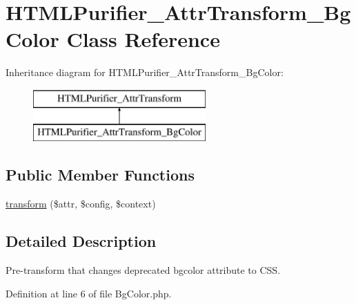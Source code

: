 \hypertarget{classHTMLPurifier__AttrTransform__BgColor}{\section{H\+T\+M\+L\+Purifier\+\_\+\+Attr\+Transform\+\_\+\+Bg\+Color Class Reference}
\label{classHTMLPurifier__AttrTransform__BgColor}
}
Inheritance diagram for H\+T\+M\+L\+Purifier\+\_\+\+Attr\+Transform\+\_\+\+Bg\+Color\+:\begin{figure}[H]
\begin{center}
\leavevmode
\includegraphics[height=2.000000cm]{classHTMLPurifier__AttrTransform__BgColor}
\end{center}
\end{figure}
\subsection*{Public Member Functions}
\begin{DoxyCompactItemize}
\item 
\hyperlink{classHTMLPurifier__AttrTransform__BgColor_a9e3101b0ebdc6f55ecd670d771c8a981}{transform} (\$attr, \$config, \$context)
\end{DoxyCompactItemize}


\subsection{Detailed Description}
Pre-\/transform that changes deprecated bgcolor attribute to C\+S\+S. 

Definition at line 6 of file Bg\+Color.\+php.



